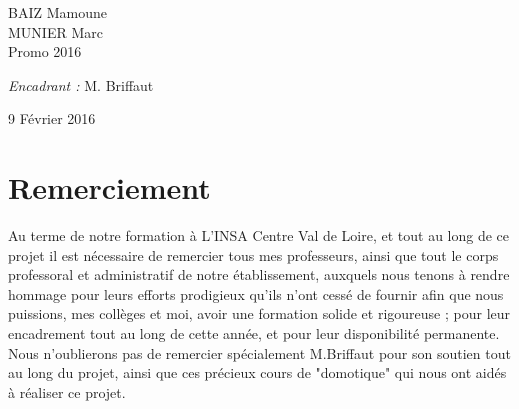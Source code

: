 {\begin{titlepage}
\begin{sffamily}
\begin{center}
    \begin{minipage}{0.4\textwidth}
      \begin{flushleft} \large
        BAIZ Mamoune \\ MUNIER Marc \\
        Promo 2016\\
      \end{flushleft}
    \end{minipage}
    \begin{minipage}{0.4\textwidth}
      \begin{flushright} \large
        \emph{Encadrant :} M. Briffaut\\
      \end{flushright}
    \end{minipage}

    \vfill

    {\large 9 Février 2016}

  \end{center}
  \end{sffamily}
\end{titlepage}
}
\newpage
\newpage



\newpage
\section*{Remerciement}
Au terme de notre formation à L’INSA Centre Val de Loire, et tout au long de ce projet il est nécessaire de remercier tous mes professeurs, ainsi que tout le corps professoral et administratif de notre établissement, auxquels nous tenons à rendre hommage pour leurs efforts prodigieux qu’ils n’ont cessé de fournir afin que nous puissions, mes collèges et moi, avoir une formation solide et rigoureuse ; pour leur encadrement tout au long de cette année, et pour leur disponibilité permanente. Nous n’oublierons pas de remercier spécialement M.Briffaut pour son soutien tout au long du projet, ainsi que ces précieux cours de "domotique" qui nous ont aidés à réaliser ce projet.\newline



